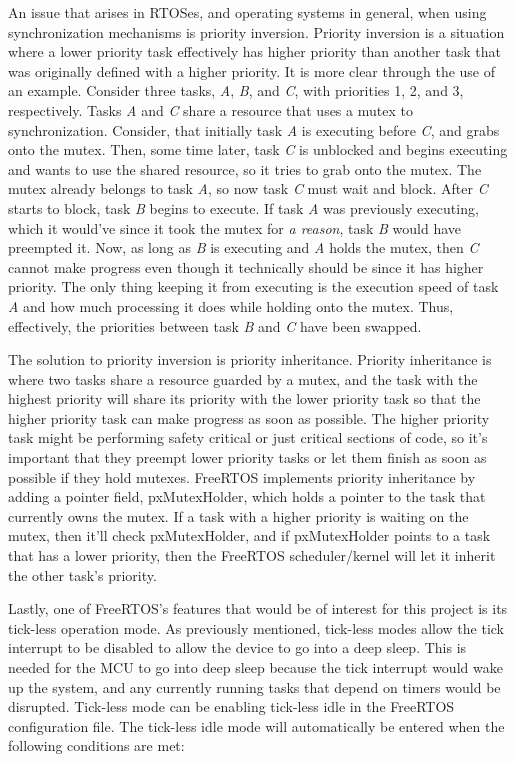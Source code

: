 An issue that arises in RTOSes, and operating systems in general, when using
synchronization mechanisms is priority inversion. Priority inversion is a
situation where a lower priority task effectively has higher priority than
another task that was originally defined with a higher priority. It is more
clear through the use of an example. Consider three tasks, \emph{A}, \emph{B},
and \emph{C}, with priorities 1, 2, and 3, respectively. Tasks \emph{A} and
\emph{C} share a resource that uses a mutex to synchronization. Consider, that
initially task \emph{A} is executing before \emph{C}, and grabs onto the mutex.
Then, some time later, task \emph{C} is unblocked and begins executing and wants
to use the shared resource, so it tries to grab onto the mutex. The mutex
already belongs to task \emph{A}, so now task \emph{C} must wait and block.
After \emph{C} starts to block, task \emph{B} begins to execute. If task
\emph{A} was previously executing, which it would've since it took the mutex for
\emph{a reason}, task \emph{B} would have preempted it. Now, as long as \emph{B}
is executing and \emph{A} holds the mutex, then \emph{C} cannot make progress
even though it technically should be since it has higher priority. The only
thing keeping it from executing is the execution speed of task \emph{A} and how
much processing it does while holding onto the mutex. Thus, effectively, the
priorities between task \emph{B} and \emph{C} have been swapped.

The solution to priority inversion is priority inheritance. Priority inheritance
is where two tasks share a resource guarded by a mutex, and the task with the
highest priority will share its priority with the lower priority task so that
the higher priority task can make progress as soon as possible. The higher
priority task might be performing safety critical or just critical sections of
code, so it's important that they preempt lower priority tasks or let them
finish as soon as possible if they hold mutexes. FreeRTOS implements priority
inheritance by adding a pointer field, pxMutexHolder, which holds a pointer to
the task that currently owns the mutex. If a task with a higher priority is
waiting on the mutex, then it'll check pxMutexHolder, and if pxMutexHolder
points to a task that has a lower priority, then the FreeRTOS scheduler/kernel
will let it inherit the other task's priority.

Lastly, one of FreeRTOS's features that would be of interest for this project is
its tick-less operation mode. As previously mentioned, tick-less modes allow the
tick interrupt to be disabled to allow the device to go into a deep sleep. This
is needed for the MCU to go into deep sleep because the tick interrupt would
wake up the system, and any currently running tasks that depend on timers would
be disrupted. Tick-less mode can be enabling tick-less idle in the FreeRTOS
configuration file. The tick-less idle mode will automatically be entered when
the following conditions are met:

